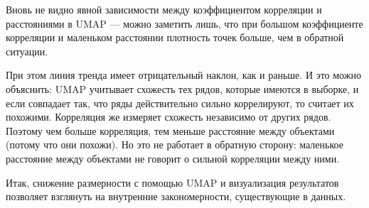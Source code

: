 Вновь не видно явной зависимости между коэффициентом корреляции и расстояниями в UMAP --- можно заметить лишь, что при большом коэффициенте корреляции и маленьком расстоянии плотность точек больше, чем в обратной ситуации.

При этом линия тренда имеет отрицательный наклон, как и раньше. И это можно объяснить: UMAP учитывает схожесть тех рядов, которые имеются в выборке, и если совпадает так, что ряды действительно сильно коррелируют, то считает их похожими. Корреляция же измеряет схожесть независимо от других рядов. Поэтому чем больше корреляция, тем меньше расстояние между объектами (потому что они похожи). Но это не работает в обратную сторону: маленькое расстояние между объектами не говорит о сильной корреляции между ними.

Итак, снижение размерности с помощью UMAP и визуализация результатов позволяет взглянуть на внутренние закономерности, существующие в данных.